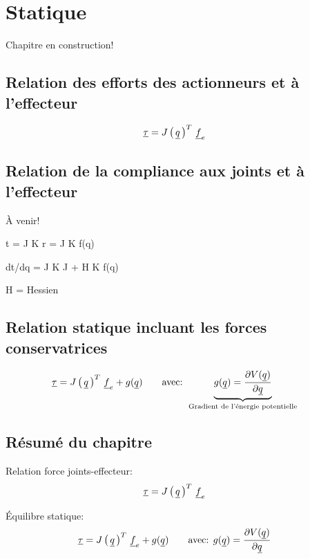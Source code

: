 \chapter{Statique}
\label{sec:static}

Chapitre en construction!

\section{Relation des efforts des actionneurs et à l'effecteur}
\label{sec:manipstatic}

\begin{align}
\underline{\tau} &= J\left( \, \underline{q} \, \right)^T \, \underline{f}_e 
\end{align}


\section{Relation de la compliance aux joints et à l'effecteur}
\label{sec:manipcompliance}

À venir!

t = J K r = J K f(q)

dt/dq = J K J + H K f(q)

H = Hessien


\section{Relation statique incluant les forces conservatrices}
\label{sec:manipstaticconservative}

\begin{align}
\underline{\tau} &= J\left( \, \underline{q} \, \right)^T \, \underline{f}_e +  g( \underline{q} )
\quad \quad \text{avec:  }
\underbrace{ g( \underline{q} ) = 
\frac{ \partial V(\underline{q} ) }{\partial \underline{q} } 
}_{\text{Gradient de l'énergie potentielle}}
\end{align}



\newpage
\section{Résumé du chapitre}


Relation force joints-effecteur:
\begin{align}
\underline{\tau} &= J\left( \, \underline{q} \, \right)^T \, \underline{f}_e 
\end{align}

Équilibre statique:
\begin{align}
\underline{\tau} &= J\left( \, \underline{q} \, \right)^T \, \underline{f}_e +  g( \underline{q} )
\quad \quad \text{avec:  }
g( \underline{q} ) = 
\frac{ \partial V(\underline{q} ) }{\partial \underline{q} } 
\end{align}
